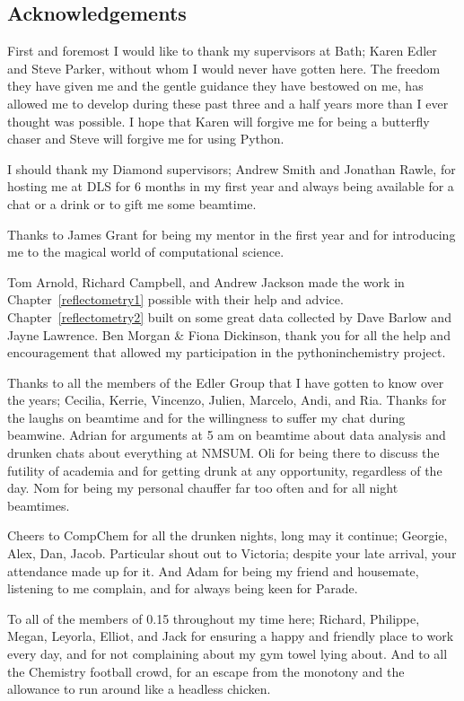 \documentclass[twoside,symmetric,nobib]{./arm-thesis}
\newcommand{\blankpage}{\newpage\hbox{}\thispagestyle{empty}\newpage}
\begin{document}
\blankpage

\newpage
\begin{fullwidth}
\thispagestyle{empty}
\chapter*{Acknowledgements}

First and foremost I would like to thank my supervisors at Bath; Karen Edler and Steve Parker, without whom I would never have gotten here.
The freedom they have given me and the gentle guidance they have bestowed on me, has allowed me to develop during these past three and a half years more than I ever thought was possible.
I hope that Karen will forgive me for being a butterfly chaser and Steve will forgive me for using Python.

I should thank my Diamond supervisors; Andrew Smith and Jonathan Rawle, for hosting me at DLS for 6 months in my first year and always being available for a chat or a drink or to gift me some beamtime.

Thanks to James Grant for being my mentor in the first year and for introducing me to the magical world of computational science.

Tom Arnold, Richard Campbell, and Andrew Jackson made the work in Chapter~\ref{reflectometry1} possible with their help and advice. Chapter~\ref{reflectometry2} built on some great data collected by Dave Barlow and Jayne Lawrence. Ben Morgan \& Fiona Dickinson, thank you for all the help and encouragement that allowed my participation in the pythoninchemistry project.

Thanks to all the members of the Edler Group that I have gotten to know over the years; Cecilia, Kerrie, Vincenzo, Julien, Marcelo, Andi, and Ria. Thanks for the laughs on beamtime and for the willingness to suffer my chat during beamwine.
Adrian for arguments at 5 am on beamtime about data analysis and drunken chats about everything at NMSUM.
Oli for being there to discuss the futility of academia and for getting drunk at any opportunity, regardless of the day.
Nom for being my personal chauffer far too often and for all night beamtimes.

Cheers to CompChem for all the drunken nights, long may it continue; Georgie, Alex, Dan, Jacob.
Particular shout out to Victoria; despite your late arrival, your attendance made up for it.
And Adam for being my friend and housemate, listening to me complain, and for always being keen for Parade.

To all of the members of 0.15 throughout my time here; Richard, Philippe, Megan, Leyorla, Elliot, and Jack for ensuring a happy and friendly place to work every day, and for not complaining about my gym towel lying about. And to all the Chemistry football crowd, for an escape from the monotony and the allowance to run around like a headless chicken.
\vspace{\baselineskip}


\end{fullwidth}
\end{document}
